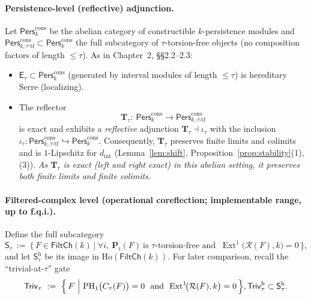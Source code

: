 \documentclass[11pt]{article}
\DeclareMathOperator{\Ext}{Ext}
\DeclareRobustCommand{\hyp}{\nobreakdash-}
\numberwithin{equation}{section}
\theoremstyle{definition}
\providecommand{\n}{\unskip\space}
\begin{document}
\paragraph{Persistence\hyp level (reflective) adjunction.}
Let $\mathsf{Pers}^{\mathrm{cons}}_k$ be the abelian category of constructible $k$-persistence modules and $\mathsf{Pers}^{\mathrm{cons}}_{k,\tau\text{-tf}}\subset \mathsf{Pers}^{\mathrm{cons}}_k$ the full subcategory of $\tau$-torsion-free objects (no composition factors of length $\le\tau$). As in Chapter~2, §§2.2–2.3:
\begin{itemize}
  \item $\mathsf{E}_\tau\subset \mathsf{Pers}^{\mathrm{cons}}_k$ (generated by interval modules of length $\le\tau$) is hereditary Serre (localizing).
  \item The reflector
  \[
  \mathbf{T}_\tau:\ \mathsf{Pers}^{\mathrm{cons}}_k\longrightarrow \mathsf{Pers}^{\mathrm{cons}}_{k,\tau\text{-tf}}
  \]
  is exact and exhibits a \emph{reflective} adjunction $\mathbf{T}_\tau\dashv \iota_\tau$ with the inclusion
  $\iota_\tau:\mathsf{Pers}^{\mathrm{cons}}_{k,\tau\text{-tf}}\hookrightarrow \mathsf{Pers}^{\mathrm{cons}}_k$.
  Consequently, $\mathbf{T}_\tau$ preserves finite limits and colimits and is $1$-Lipschitz for $d_{\mathrm{int}}$
  (Lemma~\ref{lem:shift}, Proposition~\ref{prop:stability}(1),(3)). \emph{As $\mathbf{T}_\tau$ is exact (left and right exact) in this abelian setting, it preserves both finite limits and finite colimits.}
\end{itemize}

\paragraph{Filtered\hyp complex level (operational coreflection; implementable range, up to f.q.i.).}
Define the full subcategory
\[
\mathsf{S}_\tau\ :=\ \Big\{\,F\in \mathsf{FiltCh}(k)\ \Big|\ \forall i,\ \mathbf{P}_i(F)\ \text{is $\tau$-torsion-free and }\ \Ext^1\!\big(\mathcal{R}(F),k\big)=0\,\Big\},
\]
and let $\mathsf{S}_\tau^{\mathrm{h}}$ be its image in $\mathrm{Ho}(\mathsf{FiltCh}(k))$.
For later comparison, recall the “trivial-at-$\tau$” gate
\[
\mathsf{Triv}_\tau\ :=\ \Big\{\,F\ \Big|\ \mathrm{PH}_1\big(C_\tau(F)\big)=0\ \ \text{and}\ \ \mathrm{Ext}^1\!\big(\mathcal{R}(F),k\big)=0\,\Big\},\n\qquad\n\mathsf{Triv}_\tau^{\mathrm{h}}\subset \mathsf{S}_\tau^{\mathrm{h}}.
\]
\end{document}
